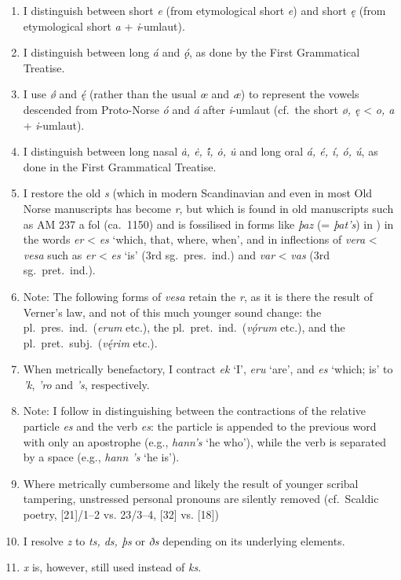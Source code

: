     \begin{enumerate}
    \item I distinguish between short \emph{e} (from etymological short \emph{e}) and short \emph{ę} (from etymological short \emph{a} + \emph{i}-umlaut).
    \item I distinguish between long \emph{á} and \emph{ǫ́}, as done by the First Grammatical Treatise.
    \item I use \emph{ǿ} and \emph{ę́} (rather than the usual \emph{œ} and \emph{æ}) to represent the vowels descended from Proto-Norse \emph{ó} and \emph{á} after \emph{i}-umlaut (cf.~the short \emph{ø, ę} < \emph{o, a} + \emph{i}-umlaut).
    \item I distinguish between long nasal \emph{ȧ, ė, i̇́, ȯ, u̇} and long oral \emph{á, é, í, ó, ú}, as done in the First Grammatical Treatise.
    \item I restore the old \emph{s} (which in modern Scandinavian and even in most Old Norse manuscripts has become \emph{r}, but which is found in old manuscripts such as AM 237 a fol (ca.~1150) and is fossilised in forms like \emph{þaz} (= \emph{þat’s}) in \Regius) in the words \emph{er} < \emph{es} ‘which, that, where, when’, and in inflections of \emph{vera} < \emph{vesa} such as \emph{er} < \emph{es} ‘is’ (3rd sg.~pres.~ind.) and \emph{var} < \emph{vas} (3rd sg.~pret.~ind.).
    \item Note: The following forms of \emph{vesa} retain the \emph{r}, as it is there the result of Verner’s law, and not of this much younger sound change: the pl.~pres.~ind.~(\emph{erum} etc.), the pl.~pret.~ind.~(\emph{vǫ́rum} etc.), and the pl.~pret.~subj.~(\emph{vę́rim} etc.).
    \item When metrically benefactory, I contract \emph{ek} ‘I’, \emph{eru} ‘are’, and \emph{es} ‘which; is’ to \emph{’k}, \emph{’ro} and \emph{’s}, respectively.
    \item Note: I follow \textcite{FinnurEdda} in distinguishing between the contractions of the relative particle \emph{es} and the verb \emph{es}: the particle is appended to the previous word with only an apostrophe (e.g., \emph{hann’s} ‘he who’), while the verb is separated by a space (e.g., \emph{hann ’s} ‘he is’).
    \item Where metrically cumbersome and likely the result of younger scribal tampering, unstressed personal pronouns are silently removed (cf.~Scaldic poetry, [21]/1--2 vs. 23/3--4, [32] vs. [18])
    \item I resolve \emph{z} to \emph{ts, ds, þs} or \emph{ðs} depending on its underlying elements.
    \item \emph{x} is, however, still used instead of \emph{ks}.
    \end{enumerate}

